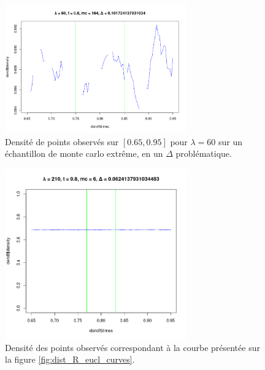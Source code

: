 \begin{figure}[H]
	\centering
	\includegraphics[width=0.7\textwidth]{Images/indiv_vs_glob/Tdensity_lbd60_mc164.png}
	\caption{Densité de points observés sur $[0.65, 0.95]$ pour $\lambda = 60$ sur un échantillon de monte carlo extrême, en un $\Delta$ problématique.}
	\label{fig:den_ex}
\end{figure}


\begin{figure}[H]
	\centering
	\includegraphics[width=0.7\textwidth]{Images/indiv_vs_glob/worst_210_67_mc6.png}
	\caption{Densité des points observés correspondant à la courbe présentée sur la figure \ref{fig:dist_R_eucl_curves}.}
	\label{fig:den_counterex}
\end{figure}








